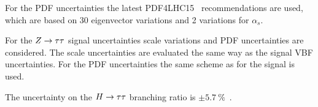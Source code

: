 \begin{description}[leftmargin=0cm]
        For the PDF uncertainties the latest PDF4LHC15~\cite{PDF4LHC15} recommendations are used, which are based on 30 eigenvector variations and 2 variations for $\alpha_s$.

    \item[$\mathbf{Z\tau\tau}$ theory systmatics:] For the $Z \to \tau \tau$ signal uncertainties scale variations and PDF uncertainties are considered.
        The scale uncertainties are evaluated the same way as the signal VBF uncertainties.
        For the PDF uncertainties the same scheme as for the signal is used.

    \item[$\mathbf{\Htt}$ branching ratio:] The uncertainty on the $H \to \tau \tau$ branching ratio is $\pm \SI{5.7}{\percent}$~\cite{YR3}.
\end{description}

